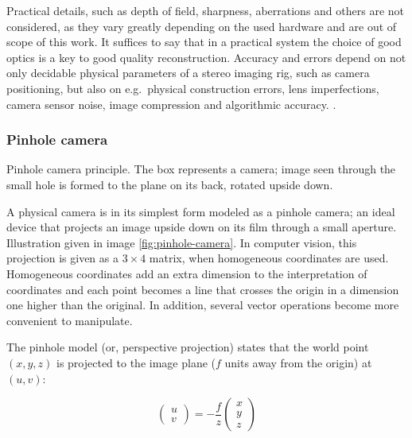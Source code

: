 Practical details, such as depth of field, sharpness, aberrations and others are not considered, as they vary greatly depending on the used hardware and are out of scope of this work.
It suffices to say that in a practical system the choice of good optics is a key to good quality reconstruction.
Accuracy and errors depend on not only decidable physical parameters of a stereo imaging rig, such as camera positioning, but also on e.g.~physical construction errors, lens imperfections, camera sensor noise, image compression and algorithmic accuracy. \cite{hollsten2013imagequality, kyto2011method,rieke2009evaluation}.


\subsubsection{Pinhole camera}

{Pinhole camera principle. The box represents a camera; image seen through the small hole is formed to the plane on its back, rotated upside down.}

A physical camera is in its simplest form modeled as a pinhole camera; an ideal device that projects an image upside down on its film through a small aperture.
Illustration given in image \ref{fig:pinhole-camera}.
In computer vision, this projection is given as a $3 \times 4$ matrix, when homogeneous coordinates are used.
Homogeneous coordinates add an extra dimension to the interpretation of coordinates and each point becomes a line that crosses the origin in a dimension one higher than the original.
In addition, several vector operations become more convenient to manipulate. \cite{hartley03multiview,heyden2005multiple}

The pinhole model (or, perspective projection) states that the world point $(x, y, z)$ is projected to the image plane ($f$ units away from the origin) at $(u, v)$:

\begin{equation}
\begin{pmatrix}
u \\ v
\end{pmatrix}
=
-\frac{f}{z} \begin{pmatrix}
x \\ y \\ z
\end{pmatrix}
\end{equation}

